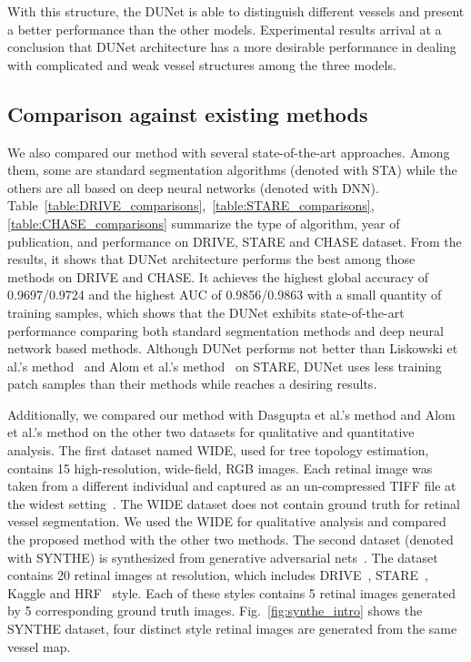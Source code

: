 \documentclass[journal]{IEEEtran}
\begin{document}
With this structure, the DUNet is able to distinguish different vessels and present a better performance than the other models. Experimental results arrival at a conclusion that DUNet architecture has a more desirable performance in dealing with complicated and weak vessel structures among the three models.

\subsection{Comparison against existing methods}
We also compared our method with several state-of-the-art approaches. Among them, some are standard segmentation algorithms (denoted with STA) while the others are all based on deep neural networks (denoted with DNN). Table~\ref{table:DRIVE_comparisons},~\ref{table:STARE_comparisons}, \ref{table:CHASE_comparisons} summarize the type of algorithm, year of publication, and performance on DRIVE, STARE and CHASE dataset. From the results, it shows that DUNet architecture performs the best among those methods on DRIVE and CHASE. It achieves the highest global accuracy of 0.9697/0.9724 and the highest AUC of 0.9856/0.9863 with a small quantity of training samples, which shows that the DUNet exhibits state-of-the-art performance comparing both standard segmentation methods and deep neural network based methods. Although DUNet performs not better than Liskowski et al.'s method~\cite{liskowski_segmenting_2016} and Alom et al.'s method~\cite{alom_recurrent_2018} on STARE, DUNet uses less training patch samples than their methods while reaches a desiring results.

Additionally, we compared our method with  Dasgupta et al.'s method and Alom et al.'s method on the other two datasets for qualitative and quantitative analysis. The first dataset named WIDE, used for tree topology estimation, contains 15 high-resolution, wide-field, RGB images. Each retinal image was taken from a different individual and captured as an un-compressed TIFF file at the widest setting~\cite{Estrada2015Tree}. The WIDE dataset does not contain ground truth for retinal vessel segmentation. We used the WIDE for qualitative analysis and compared the proposed method with the other two methods. The second dataset (denoted with SYNTHE) is synthesized from generative adversarial nets~\cite{zhao2018synthesizing}. The dataset contains 20 retinal images at  resolution, which includes DRIVE~\cite{staal_ridge-based_2004}, STARE~\cite{hoover_locating_1998}, Kaggle and HRF~\cite{Kohler2013Automatic} style. Each of these styles contains 5 retinal images generated by 5 corresponding ground truth images. Fig.~\ref{fig:synthe_intro} shows the SYNTHE dataset, four distinct style retinal images are generated from the same vessel map.
\end{document}
